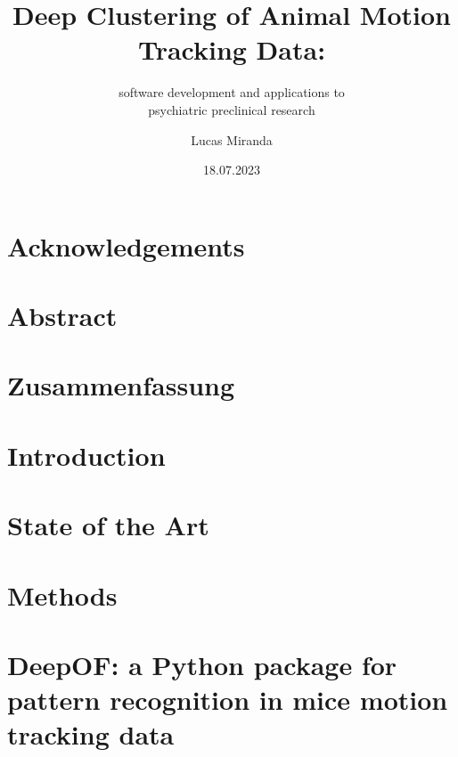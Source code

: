 \documentclass[%
]{tumDiss}
\title{Deep Clustering of Animal Motion Tracking Data: \\ }
\subtitle{software development and applications to \\ psychiatric preclinical research}
\author{Lucas Miranda}
\date{18.07.2023}
\begin{document}
\frontmatter
\maketitle

\chapter{Acknowledgements}


\chapter{Abstract}


\chapter{Zusammenfassung}



\tableofcontents
\listoffigures
\listoftables

\printglossary[type=\acronymtype, nonumberlist]

\mainmatter
\chapter{Introduction}
\label{chap:introduction}


\chapter{State of the Art}
\label{chap:sota}


\chapter{Methods}
\label{chap:methods}


\chapter{DeepOF: a Python package for pattern recognition in mice motion tracking data}
\label{chap:joss}

\end{document}
